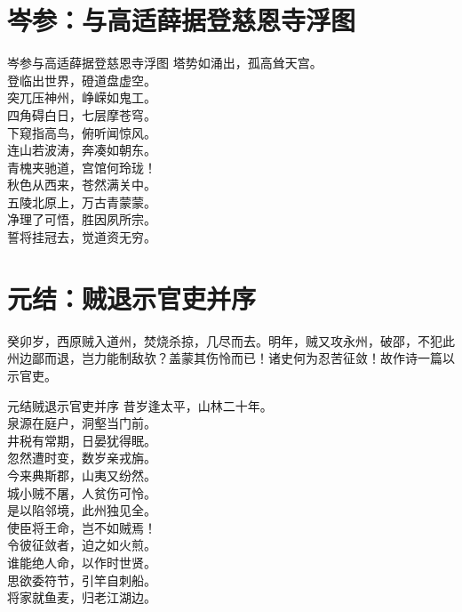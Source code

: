\documentclass[12pt,oneside,a5paper]{book}
\begin{document}
\chapter{岑参：与高适薛据登慈恩寺浮图}
\begin{poemzh}{岑参}{与高适薛据登慈恩寺浮图}
塔势如涌出，孤高耸天宫。\\
登临出世界，磴道盘虚空。\\
突兀压神州，峥嵘如鬼工。\\
四角碍白日，七层摩苍穹。\\
下窥指高鸟，俯听闻惊风。\\
连山若波涛，奔凑如朝东。\\
青槐夹驰道，宫馆何玲珑！\\
秋色从西来，苍然满关中。\\
五陵北原上，万古青蒙蒙。\\
净理了可悟，胜因夙所宗。\\
誓将挂冠去，觉道资无穷。\\ 
\end{poemzh}

\chapter{元结：贼退示官吏并序}
癸卯岁，西原贼入道州，焚烧杀掠，几尽而去。明年，贼又攻永州，破邵，不犯此州边鄙而退，岂力能制敌欤？盖蒙其伤怜而已！诸史何为忍苦征敛！故作诗一篇以示官吏。

\begin{poemzh}{元结}{贼退示官吏并序}
昔岁逢太平，山林二十年。\\
泉源在庭户，洞壑当门前。\\
井税有常期，日晏犹得眠。\\
忽然遭时变，数岁亲戎旃。\\
今来典斯郡，山夷又纷然。\\
城小贼不屠，人贫伤可怜。\\
是以陷邻境，此州独见全。\\
使臣将王命，岂不如贼焉！\\
令彼征敛者，迫之如火煎。\\
谁能绝人命，以作时世贤。\\
思欲委符节，引竿自刺船。\\
将家就鱼麦，归老江湖边。\\ 
\end{poemzh}
\end{document}
